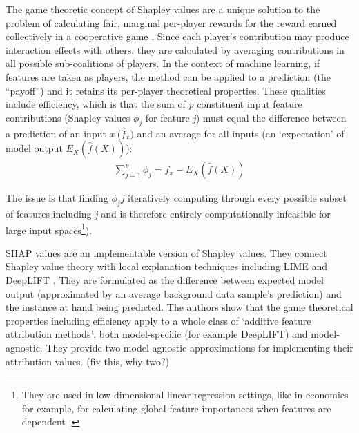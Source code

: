 \documentclass[main]{subfiles}
\begin{document}
The game theoretic concept of Shapley values are a unique solution to the problem of calculating fair, marginal per-player rewards for the reward earned collectively in a cooperative game \cite{shapley}. Since each player's contribution may produce interaction effects with others, they are calculated by averaging contributions in all possible sub-coalitions of players. In the context of machine learning, if features are taken as players, the method can be applied to a prediction (the ``payoff'') and it retains its per-player theoretical properties. These qualities include efficiency, which is that the sum of \textit{p} constituent input feature contributions (Shapley values $\phi_{j}$ for feature \textit{j}) must equal the difference between a prediction of an input \textit{x} ($\widehat{f}_{x})$ and an average for all inputs (an `expectation' of model output $E_X(\widehat{f}(X))$):
\begin{align}
\sum_{j=1}^{p}\phi_{j} = \widehat{f}_{x} - E_X(\widehat{f}(X))
\end{align}

The issue is that finding $\phi_{j}j$ iteratively computing through every possible subset of features including \textit{j} and is therefore entirely computationally infeasible for large input spaces\footnote{They are used in low-dimensional linear regression settings, like in economics for example, for calculating global feature importances when features are dependent \cite{shapley}.}). 

SHAP values are an implementable version of Shapley values. They connect Shapley value theory with local explanation techniques including LIME and DeepLIFT \cite{shap}.  They are formulated as the difference between expected model output (approximated by an average background data sample's prediction) and the instance at hand being predicted. The authors show that the game theoretical properties including efficiency apply to a whole class of `additive feature attribution methods', both model-specific (for example DeepLIFT) and model-agnostic. They provide two model-agnostic approximations for implementing their attribution values. (fix this, why two?)


 
 
\end{document}
